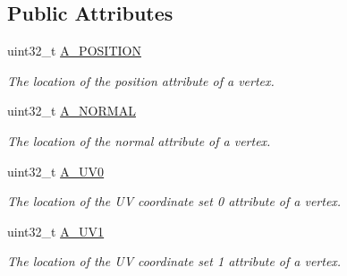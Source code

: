 \subsection*{Public Attributes}
\begin{DoxyCompactItemize}
\item 
\mbox{\label{structblaze_1_1VertexInputFormat_a667c06a846b60712be75b98463d59827}} 
uint32\+\_\+t \hyperlink{structblaze_1_1VertexInputFormat_a667c06a846b60712be75b98463d59827}{A\+\_\+\+P\+O\+S\+I\+T\+I\+ON}
\begin{DoxyCompactList}\small\item\em The location of the position attribute of a vertex. \end{DoxyCompactList}\item 
\mbox{\label{structblaze_1_1VertexInputFormat_a3c1e00b7012a2993f4316fa603dc4f01}} 
uint32\+\_\+t \hyperlink{structblaze_1_1VertexInputFormat_a3c1e00b7012a2993f4316fa603dc4f01}{A\+\_\+\+N\+O\+R\+M\+AL}
\begin{DoxyCompactList}\small\item\em The location of the normal attribute of a vertex. \end{DoxyCompactList}\item 
\mbox{\label{structblaze_1_1VertexInputFormat_a174031ae8fa572a5a6df7340d192c702}} 
uint32\+\_\+t \hyperlink{structblaze_1_1VertexInputFormat_a174031ae8fa572a5a6df7340d192c702}{A\+\_\+\+U\+V0}
\begin{DoxyCompactList}\small\item\em The location of the UV coordinate set 0 attribute of a vertex. \end{DoxyCompactList}\item 
\mbox{\label{structblaze_1_1VertexInputFormat_ab5cf84ff3d8787836792c9a4ca4bfd46}} 
uint32\+\_\+t \hyperlink{structblaze_1_1VertexInputFormat_ab5cf84ff3d8787836792c9a4ca4bfd46}{A\+\_\+\+U\+V1}
\begin{DoxyCompactList}\small\item\em The location of the UV coordinate set 1 attribute of a vertex. \end{DoxyCompactList}\end{DoxyCompactItemize}


